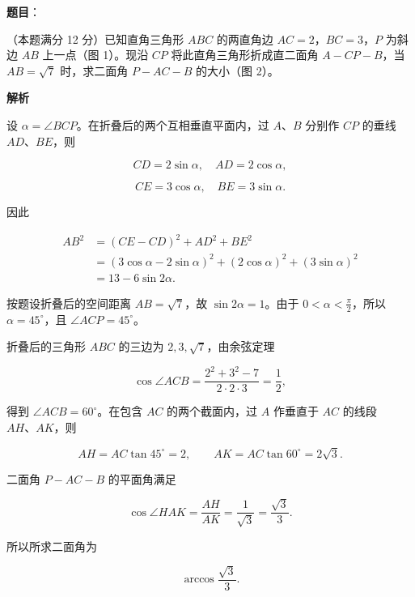 \begin{answer}

\textbf{题目}：

（本题满分 12 分）已知直角三角形 $ABC$ 的两直角边 $AC=2$，$BC=3$，$P$ 为斜边 $AB$ 上一点（图 1）。现沿 $CP$ 将此直角三角形折成直二面角 $A\mathbin{-}CP\mathbin{-}B$，当 $AB=\sqrt7$ 时，求二面角 $P\mathbin{-}AC\mathbin{-}B$ 的大小（图 2）。
\nopagebreak[4]
\begin{center}\end{center}
\nopagebreak[4]
\nopagebreak[4]
\begin{center}\end{center}
\nopagebreak[4]
\textbf{解析}

设 $\alpha=\angle BCP$。在折叠后的两个互相垂直平面内，过 $A\text{、}B$ 分别作 $CP$ 的垂线 $AD\text{、}BE$，则

\nopagebreak[4]
\[
CD=2\sin\alpha,\quad AD=2\cos\alpha,
\]

\nopagebreak[4]
\[
CE=3\cos\alpha,\quad BE=3\sin\alpha.
\]

因此

\nopagebreak[4]
\[
\begin{aligned}
AB^2
&=(CE-CD)^2+AD^2+BE^2\\
&=(3\cos\alpha-2\sin\alpha)^2
+(2\cos\alpha)^2+(3\sin\alpha)^2\\
&=13-6\sin2\alpha.
\end{aligned}
\]

按题设折叠后的空间距离 $AB=\sqrt7$，故 $\sin2\alpha=1$。由于 $0<\alpha<\frac\pi2$，所以 $\alpha=45^\circ$，且 $\angle ACP=45^\circ$。

折叠后的三角形 $ABC$ 的三边为 $2,3,\sqrt7$，由余弦定理

\nopagebreak[4]
\[
\cos\angle ACB
=\frac{2^2+3^2-7}{2\cdot2\cdot3}
=\frac12,
\]

得到 $\angle ACB=60^\circ$。在包含 $AC$ 的两个截面内，过 $A$ 作垂直于 $AC$ 的线段 $AH\text{、}AK$，则

\nopagebreak[4]
\[
AH=AC\tan45^\circ=2,\qquad
AK=AC\tan60^\circ=2\sqrt3.
\]

二面角 $P\mathbin{-}AC\mathbin{-}B$ 的平面角满足

\nopagebreak[4]
\[
\cos\angle HAK=\frac{AH}{AK}
=\frac1{\sqrt3}=\frac{\sqrt3}{3}.
\]

所以所求二面角为

\nopagebreak[4]
\[
\arccos\frac{\sqrt3}{3}.
\]


\end{answer}